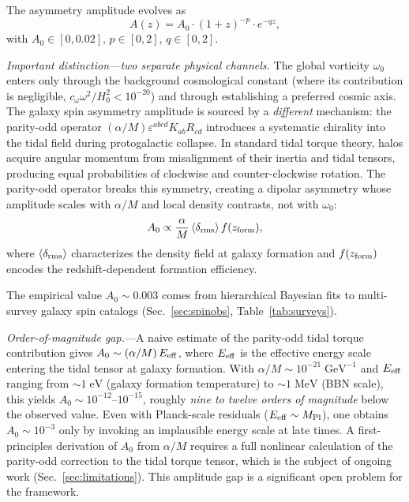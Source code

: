 \documentclass[aps,prd,twocolumn,superscriptaddress,showpacs,preprintnumbers,nofootinbib,longbibliography,floatfix]{revtex4-2}
\newcommand{\MPl}{M_{\rm Pl}}
\begin{document}
The asymmetry amplitude evolves as
\begin{equation}\label{eq:Az}
\boxed{A(z) = A_0\cdot(1+z)^{-p}\cdot e^{-qz},}
\end{equation}
with $A_0\in[0,0.02]$, $p\in[0,2]$, $q\in[0,2]$.

\textit{Important distinction---two separate physical channels.} The global vorticity $\omega_0$ enters only through the background cosmological constant (where its contribution is negligible, $c_\omega\omega^2/H_0^2 < 10^{-20}$) and through establishing a preferred cosmic axis. The galaxy spin asymmetry amplitude is sourced by a \textit{different} mechanism: the parity-odd operator $(\alpha/M)\varepsilon^{abcd}K_{ab}R_{cd}$ introduces a systematic chirality into the tidal field during protogalactic collapse. In standard tidal torque theory, halos acquire angular momentum from misalignment of their inertia and tidal tensors, producing equal probabilities of clockwise and counter-clockwise rotation. The parity-odd operator breaks this symmetry, creating a dipolar asymmetry whose amplitude scales with $\alpha/M$ and local density contrasts, not with $\omega_0$:
\begin{equation}\label{eq:A0}
A_0 \propto \frac{\alpha}{M}\,\langle\delta_{\rm rms}\rangle\,f(z_{\rm form}),
\end{equation}
where $\langle\delta_{\rm rms}\rangle$ characterizes the density field at galaxy formation and $f(z_{\rm form})$ encodes the redshift-dependent formation efficiency.

The empirical value $A_0 \sim 0.003$ comes from hierarchical Bayesian fits to multi-survey galaxy spin catalogs (Sec.~\ref{sec:spinobs}, Table~\ref{tab:surveys}).

\textit{Order-of-magnitude gap.}---A naive estimate of the parity-odd tidal torque contribution gives $A_0 \sim (\alpha/M)\,E_{\rm eff}$, where $E_{\rm eff}$ is the effective energy scale entering the tidal tensor at galaxy formation. With $\alpha/M \sim 10^{-21}\;\text{GeV}^{-1}$ and $E_{\rm eff}$ ranging from $\sim 1\;\text{eV}$ (galaxy formation temperature) to $\sim 1\;\text{MeV}$ (BBN scale), this yields $A_0 \sim 10^{-12}$--$10^{-15}$, roughly \textit{nine to twelve orders of magnitude} below the observed value. Even with Planck-scale residuals ($E_{\rm eff}\sim\MPl$), one obtains $A_0\sim 10^{-3}$ only by invoking an implausible energy scale at late times. A first-principles derivation of $A_0$ from $\alpha/M$ requires a full nonlinear calculation of the parity-odd correction to the tidal torque tensor, which is the subject of ongoing work (Sec.~\ref{sec:limitations}). This amplitude gap is a significant open problem for the framework.
\end{document}
